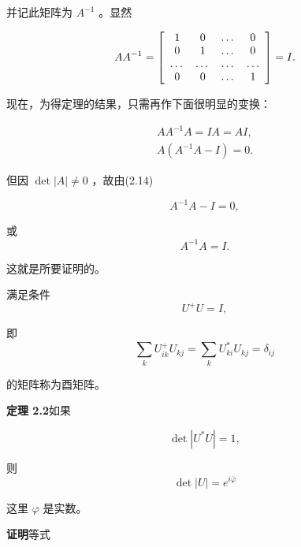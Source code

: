 并记此矩阵为 $A^{-1}$ 。显然

\begin{equation*}
A A ^ {- 1} = \left[ \begin{array}{c c c c} 1 & 0 & \dots & 0 \\ 0 & 1 & \dots & 0 \\ \dots & \dots & \dots & \dots \\ 0 & 0 & \dots & 1 \end{array} \right] = I.
\end{equation*}

现在，为得定理的结果，只需再作下面很明显的变换：

\begin{equation*}
\begin{array}{l} A A ^ {- 1} A = I A = A I, \\ A (A ^ {- 1} A - I) = 0. \end{array}
\end{equation*}

但因 $\operatorname{det}|A| \neq 0$ ，故由(2.14)

\begin{equation*}
A ^ {- 1} A - I = 0,
\end{equation*}

或
\begin{equation*}
A ^ {- 1} A = I.
\end{equation*}

这就是所要证明的。

满足条件
\begin{equation*}
U ^ {+} U = I,
\end{equation*}

即
\begin{equation*}
\sum_ {k} U _ {i k} ^ {+} U _ {k j} = \sum_ {k} U _ {k i} ^ {*} U _ {k j} = \delta_ {i j}\tag{2.18}
\end{equation*}

的矩阵称为酉矩阵。

\textbf{定理 2.2}\quad 如果

\begin{equation*}
\det | U ^ {*} U | = 1,\tag{2.19}
\end{equation*}

则
\begin{equation*}
\det | U | = e ^ {i \bar {\varphi}}\tag{2.20}
\end{equation*}

这里 $\varphi$ 是实数。

\textbf{证明}\quad 等式

